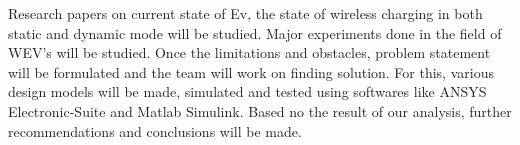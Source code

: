 Research papers on current state of Ev, the state of wireless charging in both static and dynamic mode will be studied. Major experiments done in the field of WEV's will be studied. Once the limitations and obstacles, problem statement will be formulated and the team will work on finding solution. For this, various design models will be made, simulated and tested using softwares like ANSYS Electronic-Suite and Matlab Simulink. Based no the result of our analysis, further recommendations and conclusions will be made. 
